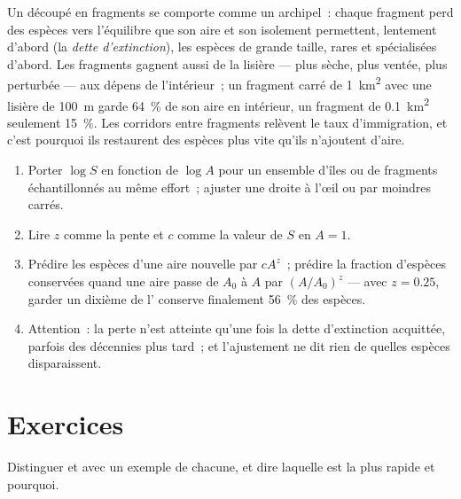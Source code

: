 \begin{proposition}[La fragmentation]\label{prop:b1:ecosystem-dynamics:fragmentation}
Un  découpé en fragments se comporte comme un archipel~: chaque
fragment perd des espèces vers l'équilibre que son aire et son
isolement permettent, lentement d'abord (la \emph{dette d'extinction}),
les espèces de grande taille, rares et spécialisées d'abord. Les
fragments gagnent aussi de la lisière --- plus sèche, plus ventée, plus
perturbée --- aux dépens de l'intérieur~; un fragment carré de
\qty{1}{km^2} avec une lisière de \qty{100}{m} garde \qty{64}{\%} de son
aire en intérieur, un fragment de \qty{0.1}{km^2} seulement
\qty{15}{\%}. Les corridors entre fragments relèvent le taux
d'immigration, et c'est pourquoi ils restaurent des espèces plus vite
qu'ils n'ajoutent d'aire.
\end{proposition}

\begin{method}\label{met:b1:ecosystem-dynamics:sar}
\begin{enumerate}
  \item Porter $\log S$ en fonction de $\log A$ pour un ensemble d'îles
        ou de fragments échantillonnés au même effort~; ajuster une
        droite à l'œil ou par moindres carrés.
  \item Lire $z$ comme la pente et $c$ comme la valeur de $S$ en $A = 1$.
  \item Prédire les espèces d'une aire nouvelle par $cA^z$~; prédire la
        fraction d'espèces conservées quand une aire passe de
        $A_0$ à $A$ par $(A/A_0)^z$ --- avec $z = 0.25$, garder un
        dixième de l' conserve finalement \qty{56}{\%} des
        espèces.
  \item Attention~: la perte n'est atteinte qu'une fois la dette
        d'extinction acquittée, parfois des décennies plus tard~; et
        l'ajustement ne dit rien de quelles espèces disparaissent.
\end{enumerate}
\end{method}

\section{Exercices}

\begin{exercise}[$\star$]\label{exo:b1:ecosystem-dynamics:1}
Distinguer  et  avec un exemple
de chacune, et dire laquelle est la plus rapide et pourquoi.
\end{exercise}

